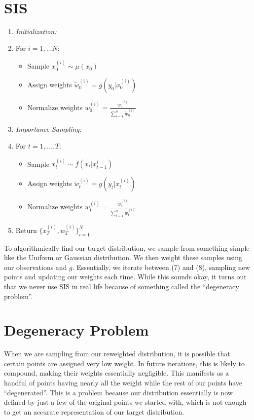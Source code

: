 \documentclass{article}
\begin{document}
\section{SIS}

\begin{enumerate}
\item \textit{Initialization:}
\item[] For $i=1,\dots N$:
\begin{itemize}
\item[] Sample $x_0^{(i)} \sim \mu(x_0)$
\item[] Assign weights $\widetilde{w}_0^{(i)} = g(y_0|x_0^{(i)})$
\item[] Normalize weights $w_0^{(i)} = \frac{\widetilde{w}_0^{(i)}}{\sum_{i=1}^{n} \widetilde{w}_0^{(i)}}$
\end{itemize}
\item \textit{Importance Sampling:}
\item[] For $t=1,\dots,T$:
\begin{itemize}
\item[] Sample $x_t^{(i)} \sim f(x_t|x_{t-1}^{i})$
\item[] Assign weights $\widetilde{w}_t^{(i)} = g(y_t|x_t^{(i)})$
\item[] Normalize weights $w_t^{(i)} = \frac{\widetilde{w}_t^{(i)}}{\sum_{i=1}^{n} \widetilde{w}_t^{(i)}}$
\end{itemize}
\item Return $\{x_T^{(i)},w_T^{(i)}\}_{i=1}^N$
\end{enumerate}

To algorithmically find our target distribution, we sample from something simple like the Uniform or Gaussian distribution. We then weight these samples using our observations and $g$. Essentially, we iterate between (7) and (8), sampling new points and updating our weights each time. While this sounds okay, it turns out that we never use SIS in real life because of something called the ``degeneracy problem''.

\section{Degeneracy Problem}
When we are sampling from our reweighted distribution, it is possible that certain points are assigned very low weight. In future iterations, this is likely to compound, making their weights essentially negligible. This manifests as a handful of points having nearly all the weight while the rest of our points have ``degenerated''. This is a problem because our distribution essentially is now defined by just a few of the original points we started with, which is not enough to get an accurate representation of our target distribution.
\end{document}
